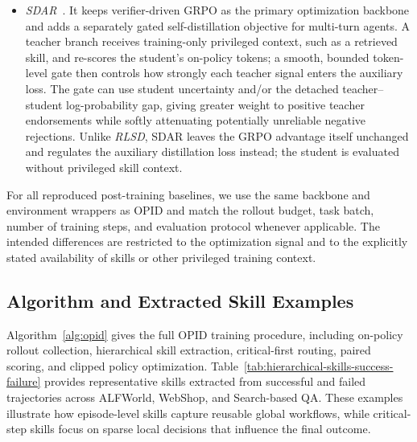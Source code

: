 \documentclass{llmxive}
\begin{document}
\begin{itemize}
    \item \textit{SDAR}~\citep{lu2026sdar}. It keeps verifier-driven GRPO as the primary optimization backbone and adds a separately gated self-distillation objective for multi-turn agents. A teacher branch receives training-only privileged context, such as a retrieved skill, and re-scores the student's on-policy tokens; a smooth, bounded token-level gate then controls how strongly each teacher signal enters the auxiliary loss. The gate can use student uncertainty and/or the detached teacher--student log-probability gap, giving greater weight to positive teacher endorsements while softly attenuating potentially unreliable negative rejections. Unlike \textit{RLSD}, SDAR leaves the GRPO advantage itself unchanged and regulates the auxiliary distillation loss instead; the student is evaluated without privileged skill context.
\end{itemize}

For all reproduced post-training baselines, we use the same backbone and environment wrappers as OPID and match the rollout budget, task batch, number of training steps, and evaluation protocol whenever applicable. The intended differences are restricted to the optimization signal and to the explicitly stated availability of skills or other privileged training context.

\subsection{Algorithm and Extracted Skill Examples}
\label{app:algorithm_skills}
Algorithm~\ref{alg:opid} gives the full OPID training procedure, including on-policy rollout collection, hierarchical skill extraction, critical-first routing, paired scoring, and clipped policy optimization. Table~\ref{tab:hierarchical-skills-success-failure} provides representative skills extracted from successful and failed trajectories across ALFWorld, WebShop, and Search-based QA. These examples illustrate how episode-level skills capture reusable global workflows, while critical-step skills focus on sparse local decisions that influence the final outcome.
\end{document}
